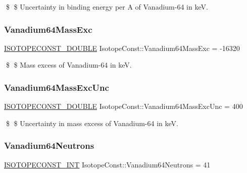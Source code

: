 \$ \$ Uncertainty in binding energy per A of Vanadium-\/64 in keV. \mbox{\label{group___isotope_const-_vanadium-_v64_gaa7d27e464d5fdec6dbed4b38db96a9c3}} 
\subsubsection{\texorpdfstring{Vanadium64\+Mass\+Exc}{Vanadium64MassExc}}
{\footnotesize\ttfamily \mbox{\hyperlink{group___isotope_const-_macros_ga8f45a7272ce02c0b4c65c44636ed719a}{I\+S\+O\+T\+O\+P\+E\+C\+O\+N\+S\+T\+\_\+\+D\+O\+U\+B\+LE}} Isotope\+Const\+::\+Vanadium64\+Mass\+Exc = -\/16320}

\$ \$ Mass excess of Vanadium-\/64 in keV. \mbox{\label{group___isotope_const-_vanadium-_v64_gabc3f1a086e260177cc125963d6e20d59}} 
\subsubsection{\texorpdfstring{Vanadium64\+Mass\+Exc\+Unc}{Vanadium64MassExcUnc}}
{\footnotesize\ttfamily \mbox{\hyperlink{group___isotope_const-_macros_ga8f45a7272ce02c0b4c65c44636ed719a}{I\+S\+O\+T\+O\+P\+E\+C\+O\+N\+S\+T\+\_\+\+D\+O\+U\+B\+LE}} Isotope\+Const\+::\+Vanadium64\+Mass\+Exc\+Unc = 400}

\$ \$ Uncertainty in mass excess of Vanadium-\/64 in keV. \mbox{\label{group___isotope_const-_vanadium-_v64_gab1f1337e29b62df3031cb55c61d9ebd9}} 
\subsubsection{\texorpdfstring{Vanadium64\+Neutrons}{Vanadium64Neutrons}}
{\footnotesize\ttfamily \mbox{\hyperlink{group___isotope_const-_macros_ga5f18360b3e99483a35c32d789e62621c}{I\+S\+O\+T\+O\+P\+E\+C\+O\+N\+S\+T\+\_\+\+I\+NT}} Isotope\+Const\+::\+Vanadium64\+Neutrons = 41}

